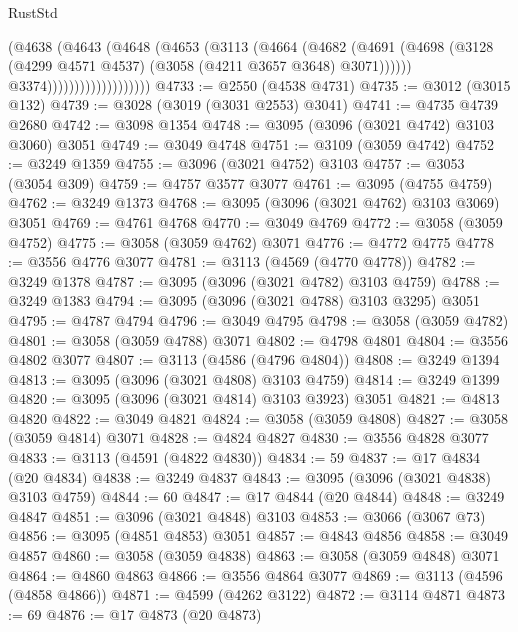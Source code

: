 \begin{lexlean}{RustStd}
\begin{coremodule}
                                (@4638
                                  (@4643
                                    (@4648
                                      (@4653
                                        (@3113
                                          (@4664
                                            (@4682
                                              (@4691
                                                (@4698
                                                  (@3128
                                                    (@4299 @4571 @4537)
                                                    (@3058 (@4211 @3657 @3648) @3071))))))
                                          @3374)))))))))))))))))))
@4733 := @2550 (@4538 @4731)
@4735 := @3012 (@3015 @132)
@4739 := @3028 (@3019 (@3031 @2553) @3041)
@4741 := @4735 @4739 @2680
@4742 := @3098 @1354
@4748 := @3095 (@3096 (@3021 @4742) @3103 @3060) @3051
@4749 := @3049 @4748
@4751 := @3109 (@3059 @4742)
@4752 := @3249 @1359
@4755 := @3096 (@3021 @4752) @3103
@4757 := @3053 (@3054 @309)
@4759 := @4757 @3577 @3077
@4761 := @3095 (@4755 @4759)
@4762 := @3249 @1373
@4768 := @3095 (@3096 (@3021 @4762) @3103 @3069) @3051
@4769 := @4761 @4768
@4770 := @3049 @4769
@4772 := @3058 (@3059 @4752)
@4775 := @3058 (@3059 @4762) @3071
@4776 := @4772 @4775
@4778 := @3556 @4776 @3077
@4781 := @3113 (@4569 (@4770 @4778))
@4782 := @3249 @1378
@4787 := @3095 (@3096 (@3021 @4782) @3103 @4759)
@4788 := @3249 @1383
@4794 := @3095 (@3096 (@3021 @4788) @3103 @3295) @3051
@4795 := @4787 @4794
@4796 := @3049 @4795
@4798 := @3058 (@3059 @4782)
@4801 := @3058 (@3059 @4788) @3071
@4802 := @4798 @4801
@4804 := @3556 @4802 @3077
@4807 := @3113 (@4586 (@4796 @4804))
@4808 := @3249 @1394
@4813 := @3095 (@3096 (@3021 @4808) @3103 @4759)
@4814 := @3249 @1399
@4820 := @3095 (@3096 (@3021 @4814) @3103 @3923) @3051
@4821 := @4813 @4820
@4822 := @3049 @4821
@4824 := @3058 (@3059 @4808)
@4827 := @3058 (@3059 @4814) @3071
@4828 := @4824 @4827
@4830 := @3556 @4828 @3077
@4833 := @3113 (@4591 (@4822 @4830))
@4834 := 59
@4837 := @17 @4834 (@20 @4834)
@4838 := @3249 @4837
@4843 := @3095 (@3096 (@3021 @4838) @3103 @4759)
@4844 := 60
@4847 := @17 @4844 (@20 @4844)
@4848 := @3249 @4847
@4851 := @3096 (@3021 @4848) @3103
@4853 := @3066 (@3067 @73)
@4856 := @3095 (@4851 @4853) @3051
@4857 := @4843 @4856
@4858 := @3049 @4857
@4860 := @3058 (@3059 @4838)
@4863 := @3058 (@3059 @4848) @3071
@4864 := @4860 @4863
@4866 := @3556 @4864 @3077
@4869 := @3113 (@4596 (@4858 @4866))
@4871 := @4599 (@4262 @3122)
@4872 := @3114 @4871
@4873 := 69
@4876 := @17 @4873 (@20 @4873)

\end{coremodule}
\end{lexlean}
